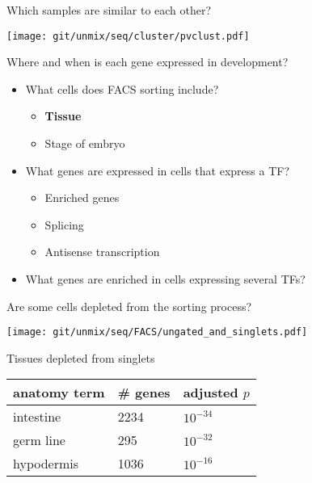 \documentclass[serif,9pt]{beamer}
\begin{document}
\begin{frame}{Which samples are similar to each other?}

\texttt{[image: git/unmix/seq/cluster/pvclust.pdf]}

\end{frame}

\begin{frame}{Where and when is each gene expressed in development?}
\begin{itemize}
\item What cells does FACS sorting include?
\begin{itemize}
\item {\bf Tissue}
\item Stage of embryo
\end{itemize}
\item What genes are expressed in cells that express a TF?
\begin{itemize}
\item Enriched genes
\item Splicing
\item Antisense transcription
\end{itemize}
\item What genes are enriched in cells expressing several TFs?
\end{itemize}
\end{frame}

\begin{frame}{Are some cells depleted from the sorting process?}

\begin{minipage}{0.58\textwidth}
\texttt{[image: git/unmix/seq/FACS/ungated\_and\_singlets.pdf]}
\end{minipage}
\pause
\begin{minipage}{0.4\textwidth}
Tissues depleted from singlets
\begin{table}[!tbp]\scriptsize
\begin{tabular}{lll}
anatomy term & \# genes & adjusted $p$ \\
\hline
intestine & 2234 & $10^{-34}$ \\
germ line & 295 & $10^{-32}$ \\
hypodermis & 1036 & $10^{-16}$ \\
\end{tabular}
\end{table}
\end{minipage}

\end{frame}
\end{document}
